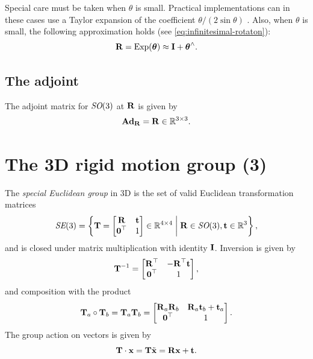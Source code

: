 Special care must be taken when $\theta$ is small.
Practical implementations can in these cases use a Taylor expansion of the coefficient $\theta / (2 \sin \theta)$ \cite{Eade2013LieTransformations}.
Also, when $\theta$ is small, the following approximation holds (see \eqref{eq:infinitesimal-rotaton}):
\begin{equation} \label{eq:SO3-Exp-approx}
  \matR = \Exp(\vectheta) \approx \matI + \vectheta^\wedge.
\end{equation}

\subsection{The adjoint}
The adjoint matrix for $\SO(3)$ at $\matR$ is given by
\begin{equation}
  \mAd_\matR = \matR  \in \bbR^{3 \times 3}.
\end{equation}

\section{The 3D rigid motion group \SE(3)} \label{sec:SE3_group}
The \emph{special Euclidean group} in 3D is the set of valid Euclidean transformation matrices
\begin{equation}
  \SE(3) = \left \{ \matT =
  \begin{bmatrix}
    \matR & \vect\\
    \matr{0}\trans & 1
  \end{bmatrix}
  \in \bbR^{4 \times 4} \;\middle|\; \matR \in \SO(3), \vect \in \bbR^3 \right \},
\end{equation}
and is closed under matrix multiplication with identity $\matI$.
Inversion is given by
\begin{equation}
  \matT^{-1} = 
  \begin{bmatrix}
    \matR\trans & -\matR\trans \vect\\
    \matr{0}\trans & 1
  \end{bmatrix},
\end{equation}
and composition with the product
\begin{equation}
  \matT_a \circ \matT_b = \matT_a \matT_b = 
  \begin{bmatrix}
    \matR_a \matR_b & \matR_a \vect_b + \vect_a\\
    \matr{0}\trans & 1
  \end{bmatrix}.
\end{equation}
The group action on vectors is given by
\begin{equation} \label{eq:SE3-group-action}
  \matT \cdot \vecx = \matT \tilde{\vecx} = \matR \vecx + \vect.
\end{equation}


